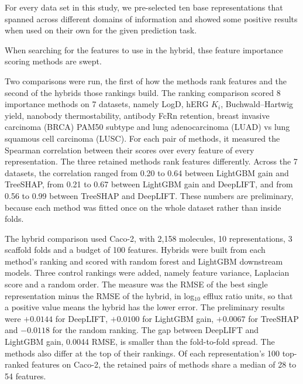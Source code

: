 For every data set in this study, we pre-selected ten base representations that spanned across different domains of information and showed some positive results when used on their own for the given prediction task.

When searching for the features to use in the hybrid, thse feature importance scoring methods are swept.

Two comparisons were run, the first of how the methods rank features and the second of the hybrids those rankings build. The ranking comparison scored 8 importance methods on 7 datasets, namely LogD, hERG $K_i$, Buchwald--Hartwig yield, nanobody thermostability, antibody FcRn retention, breast invasive carcinoma (BRCA) PAM50 subtype and lung adenocarcinoma (LUAD) vs lung squamous cell carcinoma (LUSC). For each pair of methods, it measured the Spearman correlation between their scores over every feature of every representation. The three retained methods rank features differently. Across the 7 datasets, the correlation ranged from 0.20 to 0.64 between LightGBM gain and TreeSHAP, from 0.21 to 0.67 between LightGBM gain and DeepLIFT, and from 0.56 to 0.99 between TreeSHAP and DeepLIFT. These numbers are preliminary, because each method was fitted once on the whole dataset rather than inside folds.

The hybrid comparison used Caco-2, with 2,158 molecules, 10 representations, 3 scaffold folds and a budget of 100 features. Hybrids were built from each method's ranking and scored with random forest and LightGBM downstream models. Three control rankings were added, namely feature variance, Laplacian score and a random order. The measure was the RMSE of the best single representation minus the RMSE of the hybrid, in log$_{10}$ efflux ratio units, so that a positive value means the hybrid has the lower error. The preliminary results were $+0.0144$ for DeepLIFT, $+0.0100$ for LightGBM gain, $+0.0067$ for TreeSHAP and $-0.0118$ for the random ranking. The gap between DeepLIFT and LightGBM gain, 0.0044 RMSE, is smaller than the fold-to-fold spread. The methods also differ at the top of their rankings. Of each representation's 100 top-ranked features on Caco-2, the retained pairs of methods share a median of 28 to 54 features.

